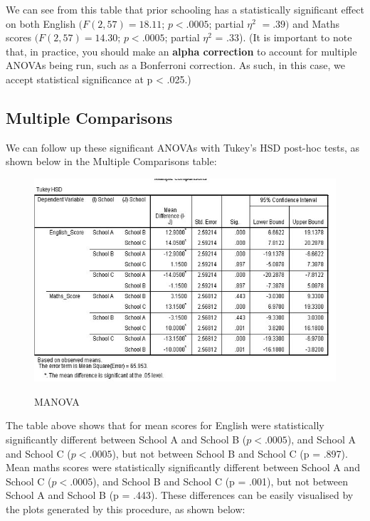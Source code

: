 \documentclass[a4paper,12pt]{article}
\begin{document}
We can see from this table that prior schooling has a statistically significant effect on both English $(F (2, 57) = 18.11$; $p < .0005$; partial $\eta^2$ $= .39)$ and Maths scores $(F (2, 57) = 14.30$; $p < .0005$; partial $\eta^2$ = .33).
(It is important to note that, in practice, you should make an \textbf{alpha correction} to account for multiple ANOVAs being run, such as a Bonferroni correction. As such, in this case, we accept statistical significance at p < .025.)





\subsection{Multiple Comparisons}
We can follow up these significant ANOVAs with Tukey's HSD post-hoc tests, as shown below in the Multiple Comparisons table:

\begin{center}
	\begin{figure}[h!]
		\includegraphics[scale=0.6]{MANOVA10}\\
		\caption{MANOVA}
	\end{figure}
\end{center}

The table above shows that for mean scores for English were statistically significantly different between School A and School B ($p < .0005$), and School A and School C ($p < .0005$), but not between School B and School C (p = .897). Mean maths scores were statistically significantly different between School A and School C ($p < .0005$), and School B and School C (p = .001), but not between School A and School B (p = .443). These differences can be easily visualised by the plots generated by this procedure, as shown below:
\end{document}
